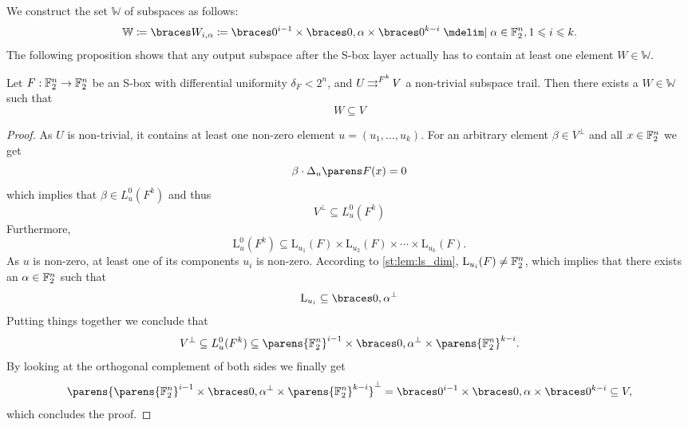 We construct the set $\mathbb{W}$ of subspaces as follows:
\begin{equation*}
    \mathbb{W} \coloneqq \set{W_{i,\alpha} \coloneqq \set{0}^{i-1} \times \set{0,\alpha} \times \set{0}^{k-i} \given \alpha \in \F_2^n, 1 \leqslant i \leqslant k}.
\end{equation*}
The following proposition shows that any output subspace after the S-box layer actually has to contain at least one element $W \in \mathbb{W}$.
\begin{proposition}\label{st:prop:w_i_alpha}
    Let $F : \mathbb{F}_2^n \to \mathbb{F}_2^n$ be an S-box with differential uniformity $\delta_F < 2^n$, and $U \operatorname*{\rightrightarrows}^{F^k}_{} V$ a non-trivial subspace trail.
    Then there exists a $W \in \mathbb{W}$ such that
    \begin{equation*}
        W \subseteq V
    \end{equation*}
\end{proposition}
\begin{proof}
As $U$ is non-trivial, it contains at least one non-zero element $u=(u_1,\dots, u_k)$.
For an arbitrary element $\beta \in V^{\perp}$ and all $x \in \mathbb{F}_2^n$ we get
\begin{equation*}
    \iprod{\beta}{\derive{u}{F}(x)} = 0
\end{equation*}
which implies that $\beta \in L^0_u(F^k)$ and thus
\begin{equation*}
    V^{\perp} \subseteq L^0_u(F^k)
\end{equation*}
Furthermore,
\begin{equation*}
    \mathrm{L}^0_u(F^k) \subseteq \mathrm{L}_{u_1}(F) \times \mathrm{L}_{u_2}(F) \times \cdots \times \mathrm{L}_{u_k}(F).
\end{equation*}
As $u$ is non-zero, at least one of its components $u_i$ is non-zero.
According to \cref{st:lem:ls_dim}, $\mathrm{L}_{u_i}(F) \ne \mathbb{F}_2^n$, which implies that there exists an $\alpha \in \mathbb{F}_2^n$ such that
\begin{equation*}
    \mathrm{L}_{u_i} \subseteq \set{0,\alpha}^{\perp}
\end{equation*}
Putting things together we conclude that
\begin{equation*}
    V^{\perp} \subseteq L^0_u(F^k) \subseteq \parens{\F_2^n}^{i-1} \times \set{0,\alpha}^{\perp} \times \parens{\F_2^n}^{k-i}.
\end{equation*}
By looking at the orthogonal complement of both sides we finally get
\begin{equation*}
    \parens{\parens{\F_2^n}^{i-1} \times \set{0,\alpha}^{\perp} \times \parens{\F_2^n}^{k-i}}^{\perp} = \set{0}^{i-1} \times \set{0,\alpha} \times \set{0}^{k-i} \subseteq V,
\end{equation*}
which concludes the proof.
\end{proof}

